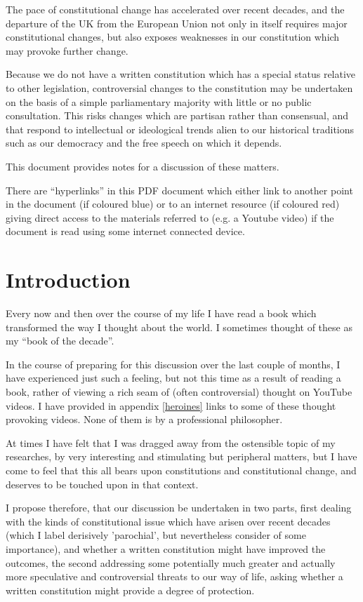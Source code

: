 \documentclass[14pt,titlepage]{extarticle}
\begin{document}

The pace of constitutional change has accelerated over recent decades,
and the departure of the UK from the European Union not only in itself
requires major constitutional changes, but also exposes weaknesses in
our constitution which may provoke further change.
 
Because we do not have a written constitution which has a special status
relative to other legislation, controversial changes to the constitution
may be undertaken on the basis of a simple parliamentary majority with little
or no public consultation.
This risks changes which are partisan rather than consensual, and that respond
to intellectual or ideological trends alien to our historical traditions such as
our democracy and the free speech on which it depends.
 
This document provides notes for a discussion of these matters.

There are ``hyperlinks'' in this PDF document which either link to another point in the document  (if coloured blue) or to an internet resource  (if coloured red) giving direct access to the materials referred to (e.g. a Youtube video) if the document is read using some internet connected device.

\section{Introduction}

Every now and then over the course of my life I have read a book which transformed the way I thought about the world.
I sometimes thought of these as my ``book of the decade''.

In the course of preparing for this discussion over the last couple of months, I have experienced just such a feeling, but not this time as a result of reading a book, rather of viewing a rich seam of (often controversial) thought on YouTube videos.
I have provided in appendix \ref{heroines} links to some of these thought provoking videos.
None of them is by a professional philosopher.

At times I have felt that I was dragged away from the ostensible topic of my researches, by very interesting and stimulating but peripheral matters, but I have come to feel that this all bears upon constitutions and constitutional change, and deserves to be touched upon in that context.

I propose therefore, that our discussion be undertaken in two parts, first dealing with the kinds of constitutional issue which have arisen over recent decades (which I label derisively 'parochial', but nevertheless consider of some importance), and whether a written constitution might have improved the outcomes, the second addressing some potentially much greater and actually more speculative and controversial threats to our way of life, asking whether a written constitution might provide a degree of protection.
\end{document}
